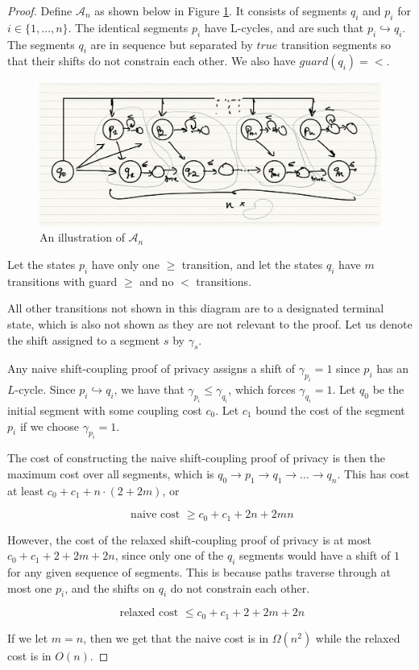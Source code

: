 \documentclass{article}
\newcommand{\1}{\langle 1 \rangle}
\newcommand{\2}{\langle 2 \rangle}
\begin{document}
\begin{proof}
    Define $\mathcal{A}_n$ as shown below in Figure \ref{fig:naive_vs_relaxed}. It consists of segments $q_i$ and $p_i$ for $i \in \{1, \dots, n\}$. The identical segments $p_i$ have L-cycles, and are such that $p_i \hookrightarrow q_i$. The segments $q_i$ are in sequence but separated by $true$ transition segments so that their shifts do not constrain each other. We also have $guard(q_i) = <$. 

    \begin{figure}[H]
        \label{fig:naive_vs_relaxed}
        \centering
        \includegraphics[width=0.8 \textwidth]{figures/naive_vs_relaxed.jpeg}
        \caption{An illustration of $\mathcal{A}_n$}
    \end{figure}

    Let the states $p_i$ have only one $\geq$ transition, and let the states $q_i$ have $m$ transitions with guard $\geq$ and no $<$ transitions. 

    All other transitions not shown in this diagram are to a designated terminal state, which is also not shown as they are not relevant to the proof. Let us denote the shift assigned to a segment $s$ by $\gamma_s$.

    Any naive shift-coupling proof of privacy assigns a shift of $\gamma_{p_i} = 1$ since $p_i$ has an $L$-cycle. Since $p_i \hookrightarrow q_i$, we have that $\gamma_{p_i} \leq \gamma_{q_i}$, which forces $\gamma_{q_i} = 1$. Let $q_0$ be the initial segment with some coupling cost $c_0$. Let $c_1$ bound the cost of the segment $p_i$ if we choose $\gamma_{p_i} = 1$. 
    
    The cost of constructing the naive shift-coupling proof of privacy is then the maximum cost over all segments, which is $q_0 \to p_1 \to q_1 \to \dots \to q_n$. This has cost at least $c_0 + c_1 + n \cdot (2 + 2m)$, or 

    \[\text{ naive cost } \geq c_0 + c_1 + 2n + 2mn\]

    However, the cost of the relaxed shift-coupling proof of privacy is at most $c_0 + c_1 + 2 + 2m + 2n$, since only one of the $q_i$ segments would have a shift of $1$ for any given sequence of segments. This is because paths traverse through at most one $p_i$, and the shifts on $q_i$ do not constrain each other. 

    \[\text{ relaxed cost } \leq c_0 + c_1 + 2 + 2m + 2n\]

    If we let $m = n$, then we get that the naive cost is in $\Omega(n^2)$ while the relaxed cost is in $O(n)$.

\end{proof}
\end{document}
